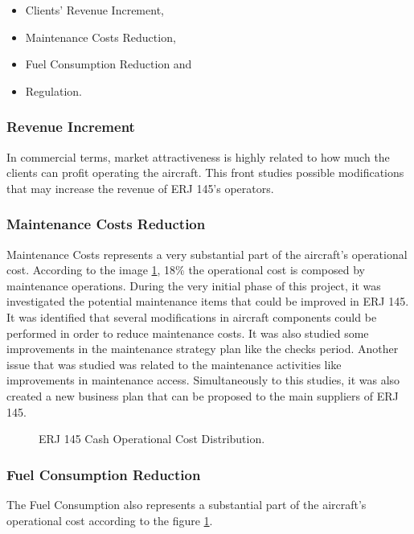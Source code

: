 \begin{itemize}
  \item Clients' Revenue Increment,
  \item Maintenance Costs Reduction,
  \item Fuel Consumption Reduction and
  \item Regulation.
\end{itemize}

\subsubsection{Revenue Increment}
In commercial terms, market attractiveness is highly related to how much the clients can profit operating the aircraft. This front studies possible modifications that may increase the revenue of ERJ 145's operators.

\subsubsection{Maintenance Costs Reduction}
Maintenance Costs represents a very substantial part of the aircraft's operational cost. According to the image \ref{fig:145COCDistribution}, 18\% the operational cost is composed by maintenance operations.
During the very initial phase of this project, it was investigated the potential maintenance items that could be improved in ERJ 145.
It was identified that several modifications in aircraft components could be performed in order to reduce maintenance costs. It was also studied some improvements in the maintenance strategy plan like the checks period. Another issue that was studied was related to the maintenance activities like improvements in maintenance access. Simultaneously to this studies, it was also created a new business plan that can be proposed to the main suppliers of ERJ 145.


\begin{figure}[H] %
\caption{ERJ 145 Cash Operational Cost Distribution.}
\label{fig:145COCDistribution}
\end{figure}

\subsubsection{Fuel Consumption Reduction}
\label{sec:FuelConsumptionRedOverview}
The Fuel Consumption also represents a substantial part of the aircraft's operational cost according to the figure \ref{fig:145COCDistribution}.

